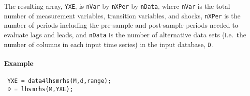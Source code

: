  The resulting array, \texttt{YXE}, is \texttt{nVar} by \texttt{nXPer} by
 \texttt{nData}, where \texttt{nVar} is the total number of measurement
 variables, transition variables, and shocks, \texttt{nXPer} is the
 number of periods including the pre-sample and post-sample periods
 needed to evaluate lags and leads, and \texttt{nData} is the number of
 alternative data sets (i.e.~the number of columns in each input time
 series) in the input database, \texttt{D}.
 
 \paragraph{Example}
 
 \begin{verbatim}
 YXE = data4lhsmrhs(M,d,range);
 D = lhsmrhs(M,YXE);
 \end{verbatim}


